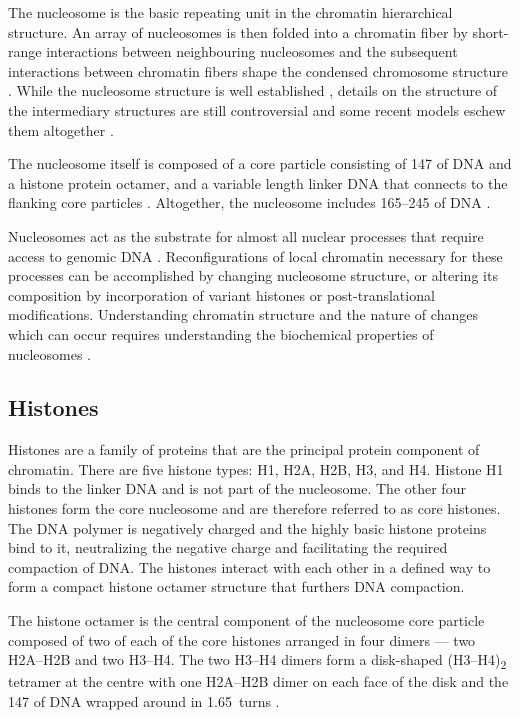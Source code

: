   The nucleosome is the
  basic repeating unit in the chromatin hierarchical structure.
  An array of nucleosomes is then folded into a chromatin fiber by
  short-range interactions between neighbouring nucleosomes
  and the subsequent interactions between chromatin fibers shape the
  condensed chromosome structure .
  While the nucleosome
  structure is well established \citep{luger1997-28angstrom},
  details on the structure of the
  intermediary structures are still controversial and some recent models
  eschew them altogether
  \citep{fussner2011-no-30nm-fibre, luger2012-chromatin-review}.

  The nucleosome itself is composed of a core particle
  consisting of \SI{147}{\bp} of DNA and a histone protein octamer,
  and a variable length linker DNA that connects
  to the flanking core particles .
  Altogether, the nucleosome includes \SIrange{165}{245}{\bp} of DNA
  \citep{widom1992-linker-length}.

  Nucleosomes act as the substrate for almost all nuclear processes that
  require access to genomic DNA \citep{controlling-double-helix}.
  Reconfigurations of local chromatin necessary for these processes can
  be accomplished by changing nucleosome structure, or altering its
  composition by incorporation of variant histones or post-translational
  modifications.
  Understanding chromatin structure and the nature of changes which can
  occur requires understanding the biochemical properties of nucleosomes
  .

  \subsection{Histones}

    Histones are a family of proteins that are the principal protein component
    of chromatin.
    There are five histone types: H1, H2A, H2B, H3, and H4.
    Histone H1 binds to the linker DNA and is not part of the nucleosome.
    The other four histones form the core
    nucleosome and are therefore referred to as core histones.
    The DNA polymer is negatively charged and the highly
    basic histone proteins bind to it, neutralizing the negative charge
    and facilitating the required compaction of DNA.
    The histones interact with each other in a defined way to form
    a compact histone octamer structure that furthers
    DNA compaction.

    The histone octamer is the central component of the nucleosome core particle
    composed of two of each of the core histones arranged in four dimers
    --- two H2A--H2B and two H3--H4.
    The two H3--H4 dimers form a disk-shaped (H3--H4)\textsubscript{2}
    tetramer at the centre 
    with one H2A--H2B dimer on each face of the disk
    and the \SI{147}{\bp} of DNA wrapped around in 1.65~turns
    .


